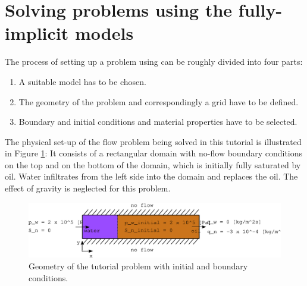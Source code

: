 \section{Solving problems using the fully-implicit models}
\label{tutorial-coupled}

The process of setting up a problem using \eWoms can be roughly
divided into four parts:
\begin{enumerate}
\item A suitable model has to be chosen.
\item The geometry of the problem and correspondingly a grid have to
  be defined.
\item Boundary and initial conditions and material properties have to be
  selected.
\end{enumerate}

The physical set-up of the flow problem being solved in this tutorial
is illustrated in Figure \ref{tutorial-coupled:problemfigure}: It
consists of a rectangular domain with no-flow boundary conditions on
the top and on the bottom of the domain, which is initially fully
saturated by oil. Water infiltrates from the left side into the domain
and replaces the oil. The effect of gravity is neglected for this
problem.

\begin{figure}[ht]
\centering
\includegraphics[width=0.9\linewidth,keepaspectratio]{EPS/tutorial-problemconfiguration}
\caption{Geometry of the tutorial problem with initial and boundary conditions.}\label{tutorial-coupled:problemfigure}
\end{figure}

